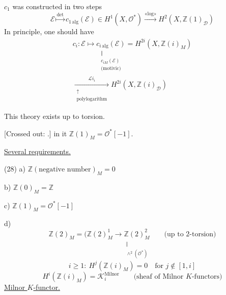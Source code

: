 $c_1$ was constructed in two steps
\begin{equation*}
\mathcal E\overset{\det}{\longmapsto}
c_{1\,\mathrm{alg}}(\mathcal E)\in H^1(X,\mathcal O^*)
\overset{\text{«}\log\text{»}}{\longrightarrow}
H^2(X,\mathbb Z(1)_{\mathcal D})\tag{26}
\end{equation*}
In principle, one should have
\begin{equation*}
\begin{gathered}
c_i:\mathcal E\longmapsto
\underset{\substack{\Vert\\c_{iM}(\mathcal E)\\\text{(motivic)}}}{c_{i\,\mathrm{alg}}(\mathcal E)}
=H^{2i}(X,\mathbb Z(i)_M)\\
\underset{\substack{\uparrow\\\text{polylogarithm}}}{\overset{\mathcal L i_i}{\longrightarrow}}
H^{2i}(X,\mathbb Z(i)_{\mathcal D})
\end{gathered}\tag{27}
\end{equation*}

This theory exists up to torsion.

[Crossed out: .]
in it $\mathbb Z(1)_M=\mathcal O^*[-1]$.

\underline{Several requirements.}

(28) a) $\mathbb Z(\text{negative number})_M=0$

b) $\mathbb Z(0)_M=\mathbb Z$

c) $\mathbb Z(1)_M=\mathcal O^*[-1]$

d)
\begin{equation*}
\mathbb Z(2)_M=(\mathbb Z(2)_M^1\longrightarrow
\underset{\substack{\Vert\\\wedge^2(\mathcal O^*)}}{\mathbb Z(2)_M^2}
\qquad\text{(up to 2-torsion)}
\end{equation*}
\begin{equation*}
i\ge1:\ H^j(\mathbb Z(i)_M)=0\quad\text{for }j\notin[1,i]\tag{29}
\end{equation*}
\begin{equation*}
H^i(\mathbb Z(i)_M)=\mathcal K_i^{\mathrm{Milnor}}
\qquad\text{(sheaf of Milnor $K$-functors)}\tag{30}
\end{equation*}
\underline{Milnor $K$-functor.}

